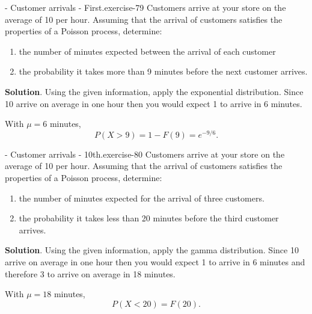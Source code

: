 \documentclass[10pt,]{book}
\numberwithin{equation}{section}
\newcommand{\lt}{<}
\newcommand{\gt}{>}
\begin{document}
%
\par
\hypertarget{p-1155}{}%
\begin{inlineexercise}{- Customer arrivals - First.}{exercise-79}%
\hypertarget{p-1156}{}%
Customers arrive at your store on the average of 10 per hour.  Assuming that the arrival of customers satisfies the properties of a Poisson process, determine: \leavevmode%
\begin{enumerate}
\item\hypertarget{li-302}{}the number of minutes expected between the arrival of each customer%
\item\hypertarget{li-303}{}the probability it takes more than 9 minutes before the next customer arrives.%
\end{enumerate}
 \textbf{Solution}.\quad%
\hypertarget{p-1157}{}%
Using the given information, apply the exponential distribution.  Since 10 arrive on average in one hour then you would expect 1 to arrive in 6 minutes.%
\par
\hypertarget{p-1158}{}%
With \(\mu = 6\) minutes,%
\begin{equation*}
P(X \gt 9) = 1 - F(9) = e^{-9/6}.
\end{equation*}
%
%
\end{inlineexercise}
%
\par
\hypertarget{p-1159}{}%
\begin{inlineexercise}{- Customer arrivals - 10th.}{exercise-80}%
\hypertarget{p-1160}{}%
Customers arrive at your store on the average of 10 per hour.  Assuming that the arrival of customers satisfies the properties of a Poisson process, determine: \leavevmode%
\begin{enumerate}
\item\hypertarget{li-304}{}the number of minutes expected for the arrival of three customers.%
\item\hypertarget{li-305}{}the probability it takes less than 20 minutes before the third customer arrives.%
\end{enumerate}
 \textbf{Solution}.\quad%
\hypertarget{p-1161}{}%
Using the given information, apply the gamma distribution.  Since 10 arrive on average in one hour then you would expect 1 to arrive in 6 minutes and therefore 3 to arrive on average in 18 minutes.%
\par
\hypertarget{p-1162}{}%
With \(\mu = 18\) minutes,%
\begin{equation*}
P(X \lt 20) = F(20).
\end{equation*}
%
%
\end{inlineexercise}
\end{document}

